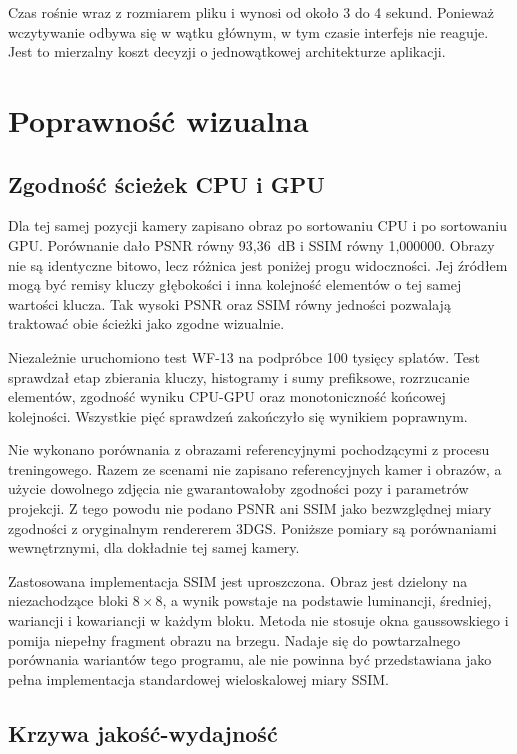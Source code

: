 Czas rośnie wraz z rozmiarem pliku i wynosi od około 3 do 4 sekund. Ponieważ wczytywanie odbywa się w wątku głównym, w tym czasie interfejs nie reaguje. Jest to mierzalny koszt decyzji o jednowątkowej architekturze aplikacji.

\section{Poprawność wizualna}
\label{sec:poprawnosc_wizualna}

\subsection{Zgodność ścieżek CPU i GPU}

Dla tej samej pozycji kamery zapisano obraz po sortowaniu CPU i po sortowaniu GPU. Porównanie dało PSNR równy 93,36~dB i SSIM równy 1,000000. Obrazy nie są identyczne bitowo, lecz różnica jest poniżej progu widoczności. Jej źródłem mogą być remisy kluczy głębokości i inna kolejność elementów o tej samej wartości klucza. Tak wysoki PSNR oraz SSIM równy jedności pozwalają traktować obie ścieżki jako zgodne wizualnie.

Niezależnie uruchomiono test WF-13 na podpróbce 100 tysięcy splatów. Test sprawdzał etap zbierania kluczy, histogramy i sumy prefiksowe, rozrzucanie elementów, zgodność wyniku CPU-GPU oraz monotoniczność końcowej kolejności. Wszystkie pięć sprawdzeń zakończyło się wynikiem poprawnym.

Nie wykonano porównania z obrazami referencyjnymi pochodzącymi z procesu treningowego. Razem ze scenami nie zapisano referencyjnych kamer i obrazów, a użycie dowolnego zdjęcia nie gwarantowałoby zgodności pozy i parametrów projekcji. Z tego powodu nie podano PSNR ani SSIM jako bezwzględnej miary zgodności z oryginalnym rendererem 3DGS. Poniższe pomiary są porównaniami wewnętrznymi, dla dokładnie tej samej kamery.

Zastosowana implementacja SSIM jest uproszczona. Obraz jest dzielony na niezachodzące bloki $8\times8$, a wynik powstaje na podstawie luminancji, średniej, wariancji i kowariancji w każdym bloku. Metoda nie stosuje okna gaussowskiego i pomija niepełny fragment obrazu na brzegu. Nadaje się do powtarzalnego porównania wariantów tego programu, ale nie powinna być przedstawiana jako pełna implementacja standardowej wieloskalowej miary SSIM.

\subsection{Krzywa jakość-wydajność}
\label{subsec:jakosc_wydajnosc}


